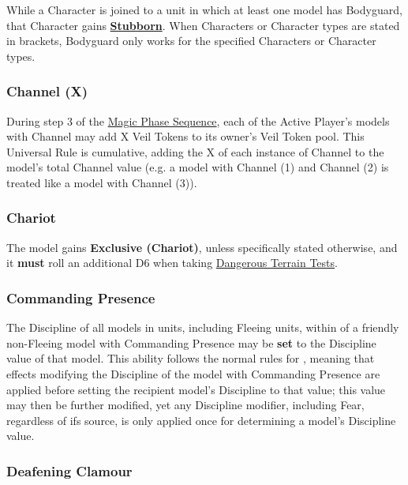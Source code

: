 While a Character is joined to a unit in which at least one model has Bodyguard, that Character gains \hyperref[stubborn]{\textbf{Stubborn}}. When Characters or Character types are stated in brackets, Bodyguard only works for the specified Characters or Character types.

\subsubsection{Channel (X)}
\idx[main=y]{\channel{}}\label{channel}

During step 3 of the \hyperref[magic_phase_sequence]{Magic Phase Sequence}, each of the Active Player's models with Channel may add X Veil Tokens to its owner's Veil Token pool. This Universal Rule is cumulative, adding the X of each instance of Channel to the model's total Channel value (e.g. a model with Channel (1) and Channel (2) is treated like a model with Channel (3)).

\subsubsection{Chariot}
\idx[main=y]{\chariot}\label{chariot}

The model gains \textbf{Exclusive (Chariot)}, unless specifically stated otherwise, and it \textbf{must} roll an additional D6 when taking \hyperref[dangerous_terrain]{Dangerous Terrain Tests}.

\subsubsection{Commanding Presence}
\idx[main=y]{\commandingpresence{}}\label{commanding_presence}

The Discipline of all models in units, including Fleeing units, within  of a friendly non-Fleeing model with Commanding Presence may be \textbf{set} to the Discipline value of that model. This ability follows the normal rules for , meaning that effects modifying the Discipline of the model with Commanding Presence are applied before setting the recipient model's Discipline to that value; this value may then be further modified, yet any Discipline modifier, including Fear, regardless of ifs source, is only applied once for determining a model's Discipline value.

\subsubsection{Deafening Clamour}
\idx[main=y]{\deafeningclamour{}}\label{deafening_clamour}

